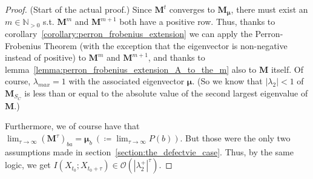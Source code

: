 \documentclass[../../main.tex]{subfiles}
\begin{document}
\begin{proof}
        (Start of the actual proof.) Since $\bm{M}^t$ converges to $\bm{M_\mu}$, there must exist an $m \in \mathbb{N}_{>0}$ s.t. $\bm{M}^m$ and $\bm{M}^{m + 1}$ both have a positive row. Thus, thanks to corollary~\ref{corollary:perron_frobenius_extension} we can apply the Perron-Frobenius Theorem (with the exception that the eigenvector is non-negative instead of positive) to $\bm{M}^m$ and $\bm{M}^{m + 1}$, and thanks to lemma~\ref{lemma:perron_frobenius_extension_A_to_the_m} also to $\bm{M}$ itself. Of course, $\lambda_{max} = 1$ with the associated eigenvector $\bm{\mu}$. (So we know that $|\lambda_2| < 1$ of $\bm{M}_{S_C}$ is less than or equal to the absolute value of the second largest eigenvalue of $\bm{M}$.)

        Furthermore, we of course have that $\lim_{\tau \to \infty} (\bm{M}^\tau)_{ba} = \bm{\mu}_b \ (\coloneqq \lim_{\tau \to \infty} P(b))$. But those were the only two assumptions made in section~\ref{section:the_defectvie_case}. Thus, by the same logic, we get $I(X_{t_0}; X_{t_0 + \tau}) \in \mathcal{O}(|\lambda_2^+|^\tau)$.
    \end{proof}
\end{document}
